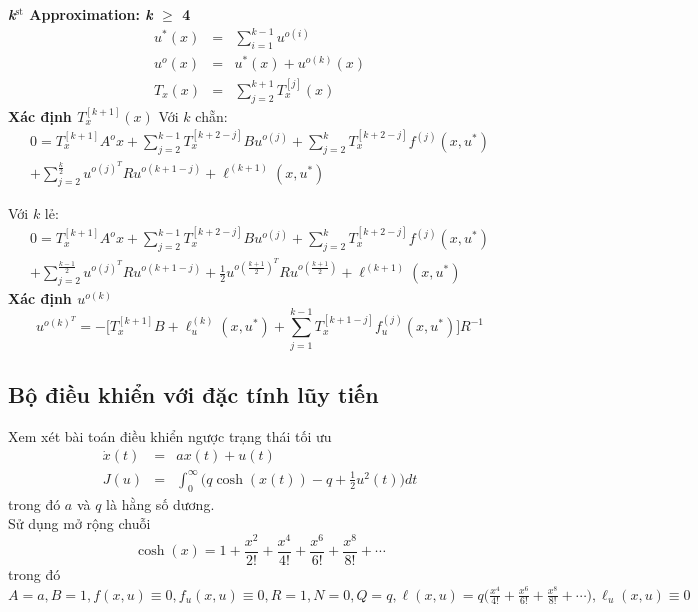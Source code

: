 \documentclass[11pt]{beamer}
\begin{document}
\begin{frame}
	\textbf{\textit{k}$^\text{st}$ Approximation: \textit{k} $\geq$ 4}
	\begin{eqnarray}
	u^*(x) &=& \sum_{i=1}^{k-1}u^{o(i)} \nonumber\\ u^{o}(x) &=& u^*(x) + u^{o(k)}(x) \nonumber\\ T_x(x) &=& \sum_{j=2}^{k+1}T_x^{[j]}(x) \nonumber
	\end{eqnarray}
\textbf{Xác định $T_x^{[k+1]}(x)$} \qquad Với $k$ chẵn:
		\begin{equation}
		\begin{split}
		0 = T_x^{[k+1]}A^ox + \sum_{j=2}^{k-1}T_x^{[k+2-j]}Bu^{o(j)} + \sum_{j=2}^{k}T_x^{[k+2-j]}f^{(j)}(x, u^*) \\+ \sum_{j=2}^{\frac{k}{2}}u^{o(j)^T}Ru^{o(k+1-j)} + \ell^{(k+1)}(x, u^*)
		\end{split} 
		\end{equation}
\end{frame}

\begin{frame}
	Với $k$ lẻ:
	\begin{equation}
	\begin{split}
	0 = T_x^{[k+1]}A^ox + \sum_{j=2}^{k-1}T_x^{[k+2-j]}Bu^{o(j)} + \sum_{j=2}^{k}T_x^{[k+2-j]}f^{(j)}(x, u^*) \\ + \sum_{j=2}^{\frac{k-1}{2}}u^{o(j)^T}Ru^{o(k+1-j)} + \frac{1}{2}
	u^{o(\frac{k+1}{2})^T}Ru^{o(\frac{k+1}{2})} + \ell^{(k+1)}(x, u^*) 		
	\end{split}
	\end{equation}
	\textbf{Xác định $u^{o(k)}$} 
	\begin{equation}
		u^{o(k)^T} = - \Big[T_x^{[k+1]}B + \ell_u^{(k)}(x, u^*) + \sum_{j=1}^{k-1}T_x^{[k+1-j]}f_u^{(j)}(x, u^*)\Big]R^{-1}
	\end{equation}
\end{frame}

\subsection{Bộ điều khiển với đặc tính lũy tiến}

\begin{frame}
	Xem xét bài toán điều khiển ngược trạng thái tối ưu 
	\begin{eqnarray}
	\dot{x}(t) &=& ax(t) + u(t) \nonumber \\ J(u) &=& \int_{0}^{\infty}\Big(q\cosh(x(t))-q+\frac{1}{2}u^2(t)\Big)dt \nonumber
	\end{eqnarray} trong đó $a$ và $q$ là hằng số dương. \\ Sử dụng mở rộng chuỗi $$\cosh(x) = 1 + \frac{x^2}{2!} + \frac{x^4}{4!} + \frac{x^6}{6!} + \frac{x^8}{8!} + \cdots$$ trong đó 
	$A=a, B=1, f(x, u)\equiv 0, f_u(x, u) \equiv 0, R=1, N=0, Q=q, \ell(x, u)=q\Big(\frac{x^4}{4!} + \frac{x^6}{6!}+\frac{x^8}{8!} + \cdots\Big) , \ell_u(x, u) \equiv 0$
\end{frame}
\end{document}
